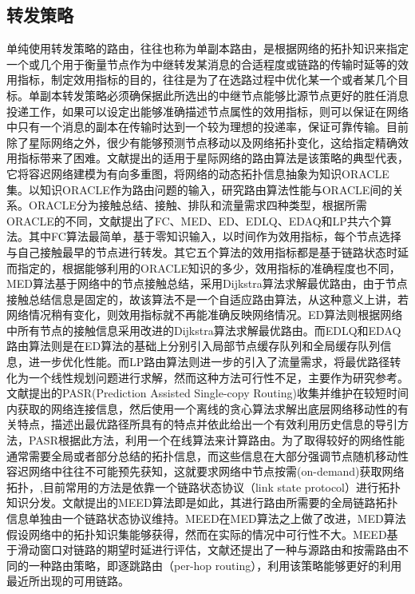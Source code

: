 \subsection{转发策略}

单纯使用转发策略的路由，往往也称为单副本路由，是根据网络的拓扑知识来指定一个或几个用于衡量节点作为中继转发某消息的合适程度或链路的传输时延等的效用指标，制定效用指标的目的，往往是为了在选路过程中优化某一个或者某几个目标。单副本转发策略必须确保据此所选出的中继节点能够比源节点更好的胜任消息投递工作，如果可以设定出能够准确描述节点属性的效用指标，则可以保证在网络中只有一个消息的副本在传输时达到一个较为理想的投递率，保证可靠传输。目前除了星际网络之外，很少有能够预测节点移动以及网络拓扑变化，这给指定精确效用指标带来了困难。文献\cite{Jain2004}提出的适用于星际网络的路由算法是该策略的典型代表，它将容迟网络建模为有向多重图，将网络的动态拓扑信息抽象为知识ORACLE集。以知识ORACLE作为路由问题的输入，研究路由算法性能与ORACLE间的关系。ORACLE分为接触总结、接触、排队和流量需求四种类型，根据所需ORACLE的不同，文献\cite{Jain2004}提出了FC、MED、ED、EDLQ、EDAQ和LP共六个算法。其中FC算法最简单，基于零知识输入，以时间作为效用指标，每个节点选择与自己接触最早的节点进行转发。其它五个算法的效用指标都是基于链路状态时延而指定的，根据能够利用的ORACLE知识的多少，效用指标的准确程度也不同，MED算法基于网络中的节点接触总结，采用Dijkstra算法求解最优路由，由于节点接触总结信息是固定的，故该算法不是一个自适应路由算法，从这种意义上讲，若网络情况稍有变化，则效用指标就不再能准确反映网络情况。ED算法则根据网络中所有节点的接触信息采用改进的Dijkstra算法求解最优路由。而EDLQ和EDAQ路由算法则是在ED算法的基础上分别引入局部节点缓存队列和全局缓存队列信息，进一步优化性能。而LP路由算法则进一步的引入了流量需求，将最优路径转化为一个线性规划问题进行求解，然而这种方法可行性不足，主要作为研究参考。文献\cite{Guo2013}提出的PASR(Prediction Assisted Single-copy Routing)收集并维护在较短时间内获取的网络连接信息，然后使用一个离线的贪心算法求解出底层网络移动性的有关特点，描述出最优路径所具有的特点并依此给出一个有效利用历史信息的导引方法，PASR根据此方法，利用一个在线算法来计算路由。为了取得较好的网络性能通常需要全局或者部分总结的拓扑信息，而这些信息在大部分强调节点随机移动性容迟网络中往往不可能预先获知，这就要求网络中节点按需(on-demand)获取网络拓扑，,目前常用的方法是依靠一个链路状态协议（link state protocol）进行拓扑知识分发。文献\cite{Jones2007}提出的MEED算法即是如此，其进行路由所需要的全局链路拓扑信息单独由一个链路状态协议维持。MEED在MED算法之上做了改进，MED算法假设网络中的拓扑知识集能够获得，然而在实际的情况中可行性不大。MEED基于滑动窗口对链路的期望时延进行评估，文献\cite{Jones2007}还提出了一种与源路由和按需路由不同的一种路由策略，即逐跳路由（per-hop routing），利用该策略能够更好的利用最近所出现的可用链路。

